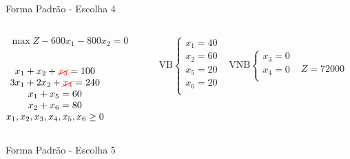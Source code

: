 \begin{frame}
{\begin{block}{Forma Padrão - {\color{cyan}Escolha 4}}
			\begin{columns}
				\begin{column}{0.35\textwidth}
					$
						\begin{matrix}
							\max Z - 600x_1 - 800x_2 = 0 \\
						\end{matrix}
					$ \\
					 \\
					$
						\begin{matrix}
							x_1  + x_2  + {\color{red}\cancel{x_3}}                   = 100 \\
							3x_1 + 2x_2       + {\color{red}\cancel{x_4}}             = 240 \\
							x_1                     + x_5       = 60 \\
							x_2                           + x_6 = 80 \\
							x_1,x_2, x_3, x_4, x_5, x_6 \ge 0 \\
						\end{matrix}
					$
				\end{column}
				\vline
				\hspace{0.1cm}
				\begin{column}{0.45\textwidth}
						$
							\begin{matrix}
								\text{VB} \left\{  \begin{matrix}
																 x_1 = 40 \\
																 x_2 = 60 \\
																 x_5 = 20 \\
																 x_6 = 20 \\
												   \end{matrix} 
										   \right.
								&
								\text{VNB} \left\{  \begin{matrix}
																 x_3 = 0 \\
																 x_4 = 0 \\
												   \end{matrix} 
										   \right. 
								\\
							 & \\
							\end{matrix}
						$
						{\color{red}$ Z = 72000 $}
				\end{column}
			\end{columns}
		\end{block}
	}
	{
		\begin{block}{Forma Padrão - {\color{cyan}Escolha 5}}

\end{block}}
\end{frame}
